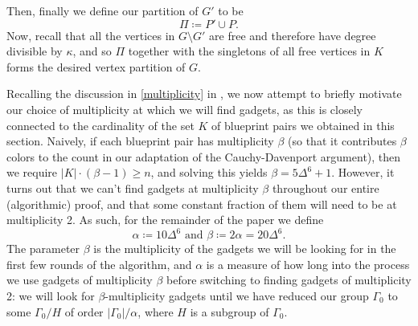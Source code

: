 \documentclass{article}
\theoremstyle{definition}
\begin{document}
Then, finally we define our partition of $G'$ to be 
\begin{equation}\label{eq.G'partition}
    \Pi \coloneqq  P' \cup P.
\end{equation}
Now, recall that all the vertices in $G\setminus G'$ are free and therefore have degree divisible by $\kappa$, and so $\Pi$ together with the singletons of all free vertices in $K$ forms the desired vertex partition of $G$.


Recalling the discussion in \cref{multiplicity} in , we now attempt to briefly motivate our choice of multiplicity at which we will find gadgets, as this is closely connected to the cardinality of the set $K$ of blueprint pairs we obtained in this section. Naively, if each blueprint pair has multiplicity $\beta$ (so that it contributes $\beta$ colors to the count in our adaptation of the Cauchy-Davenport argument), then we require $|K|\cdot (\beta-1) \geq n$, and solving this yields $\beta = 5\Delta^6+1$. However, it turns out that we can't find gadgets at multiplicity $\beta$ throughout our entire (algorithmic) proof, and that some constant fraction of them will need to be at multiplicity 2. As such, for the remainder of the paper we define
\begin{equation}\label{equ:alphabeta}
    \alpha\coloneqq  10\Delta^6 \text{ and } \beta\coloneqq  2\alpha=20\Delta^6.
\end{equation} 
The parameter $\beta$ is the multiplicity of the gadgets we will be looking for in the first few rounds of the algorithm, and $\alpha$ is a measure of how long into the process we use gadgets of multiplicity $\beta$ before switching to finding gadgets of multiplicity 2: we will look for $\beta$-multiplicity gadgets until we have reduced our group $\Gamma_0$ to some $\Gamma_0/H$ of order $|\Gamma_0|/\alpha$, where $H$ is a subgroup of $\Gamma_0$.
\end{document}
